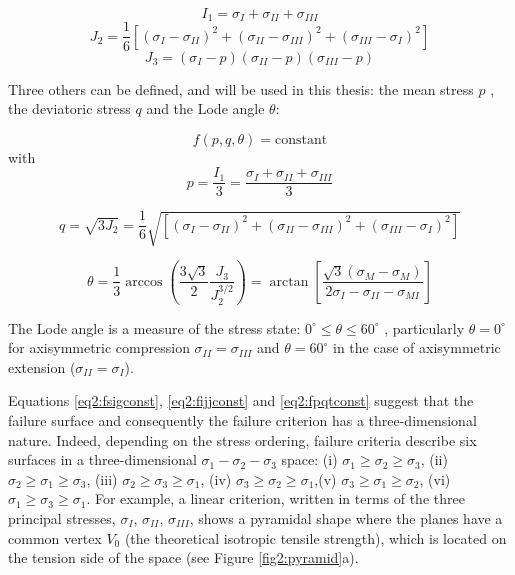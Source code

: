 \begin{equation}
   I_1 = \sigma_{I} + \sigma_{II} + \sigma_{III}
\end{equation}
\begin{equation}
    J_{2} = \frac{1}{6}\left[\left(\sigma_{I}-\sigma_{I I}\right)^{2}+\left(\sigma_{I I}-\sigma_{I I I}\right)^{2}+\left(\sigma_{I I I}-\sigma_{I}\right)^{2}\right]
\end{equation}
\begin{equation}
    J_{3} = \left(\sigma_{I}-p\right)\left(\sigma_{I I}-p\right)\left(\sigma_{III}-p\right)
\end{equation}

Three others can be defined, and will be used in this thesis: the mean stress $p$ , the deviatoric stress $q$ and the Lode angle $\theta$:

\begin{equation} \label{eq2:fpqtconst}
    f(p,q,\theta) = \text{constant}
\end{equation}
with
\begin{equation} \label{eq2:peq}
    p=\frac{I_{1}}{3}=\frac{\sigma_{I}+\sigma_{II}+\sigma_{III}}{3}
\end{equation}

\begin{equation}\label{eq2:qeq}
    q=\sqrt{3 J_{2}}=\frac{1}{6} \sqrt{\left[\left(\sigma_{I}-\sigma_{II}\right)^{2}+\left(\sigma_{II}-\sigma_{III}\right)^{2}+\left(\sigma_{III}-\sigma_{I}\right)^{2}\right]}
\end{equation}

\begin{equation}\label{eq2:theta}
    \theta=\frac{1}{3} \arccos \left(\frac{3 \sqrt{3}}{2} \frac{J_{3}}{J_{2}^{3 / 2}}\right)=\arctan \left[\frac{\sqrt{3}\left(\sigma_{M}-\sigma_{M}\right)}{2 \sigma_{I}-\sigma_{I I}-\sigma_{M I}}\right]
\end{equation}

The Lode angle is a measure of the stress state: $0^{\circ} \leq \theta \leq 60^{\circ}$ , particularly $\theta = 0^{\circ}$  for axisymmetric compression $\sigma_{II} = \sigma_{III} $ and $\theta = 60^{\circ}$ in the case of axisymmetric extension ($\sigma_{II} = \sigma_{I} $). 

Equations \ref{eq2:fsigconst}, \ref{eq2:fijjconst} and \ref{eq2:fpqtconst} suggest that the failure surface and consequently the failure criterion has a three-dimensional nature. Indeed, depending on the stress ordering, failure criteria describe six surfaces in a three-dimensional  $\sigma_1 -\sigma_2 -\sigma_3$  space: (i) $\sigma_1 \geq \sigma_2 \geq \sigma_3$, (ii) $\sigma_2 \geq \sigma_1 \geq \sigma_3$, (iii) $\sigma_2 \geq \sigma_3 \geq \sigma_1$, (iv) $\sigma_3 \geq \sigma_2 \geq \sigma_1$,(v) $\sigma_3 \geq \sigma_1 \geq \sigma_2$, (vi) $\sigma_1 \geq \sigma_3 \geq \sigma_1$. For example, a linear criterion, written in terms of the three principal stresses, $\sigma_I$, $\sigma_{II}$, $\sigma_{III}$, shows a pyramidal shape where the planes have a common vertex $V_0$ (the theoretical isotropic tensile strength), which is located on the tension side of the space (see Figure \ref{fig2:pyramid}a).  

